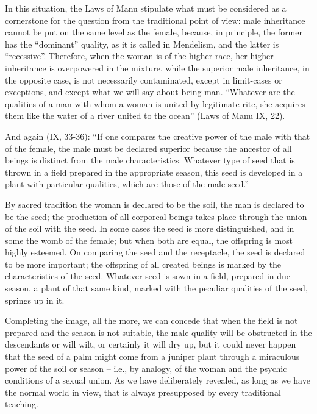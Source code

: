 In this situation, the Laws of Manu stipulate what must be considered as a cornerstone for the question from the traditional point of view: male inheritance cannot be put on the same level as the female, because, in principle, the former has the ``dominant'' quality, as it is called in Mendelism, and the latter is ``recessive''. Therefore, when the woman is of the higher race, her higher inheritance is overpowered in the mixture, while the superior male inheritance, in the opposite case, is not necessarily contaminated, except in limit-cases or exceptions, and except what we will say about being man. ``Whatever are the qualities of a man with whom a woman is united by legitimate rite, she acquires them like the water of a river united to the ocean'' (Laws of Manu IX, 22).

And again (IX, 33-36): ``If one compares the creative power of the male with that of the female, the male must be declared superior because the ancestor of all beings is distinct from the male characteristics. Whatever type of seed that is thrown in a field prepared in the appropriate season, this seed is developed in a plant with particular qualities, which are those of the male seed.''

\begin{quotex}
By sacred tradition the woman is declared to be the soil, the man is declared to be the seed; the production of all corporeal beings takes place through the union of the soil with the seed. In some cases the seed is more distinguished, and in some the womb of the female; but when both are equal, the offspring is most highly esteemed. On comparing the seed and the receptacle, the seed is declared to be more important; the offspring of all created beings is marked by the characteristics of the seed. Whatever seed is sown in a field, prepared in due season, a plant of that same kind, marked with the peculiar qualities of the seed, springs up in it.
\end{quotex}


Completing the image, all the more, we can concede that when the field is not prepared and the season is not suitable, the male quality will be obstructed in the descendants or will wilt, or certainly it will dry up, but it could never happen that the seed of a palm might come from a juniper plant through a miraculous power of the soil or season -- i.e., by analogy, of the woman and the psychic conditions of a sexual union. As we have deliberately revealed, as long as we have the normal world in view, that is always presupposed by every traditional teaching.

